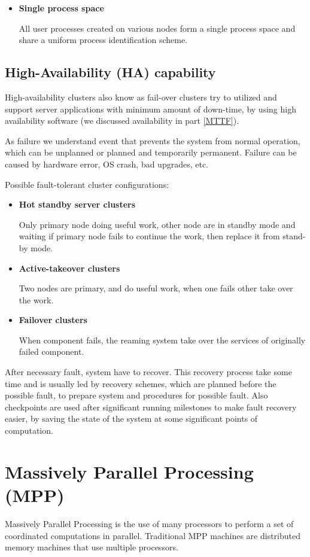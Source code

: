 \documentclass[12pt]{report}
\begin{document}
\begin{itemize}
\item \textbf{Single process space}

		All user processes created on various nodes form a single process space
and share a uniform process identification scheme.

\end{itemize}

\subsection{High-Availability (HA) capability}
High-availability clusters also know as fail-over clusters try to utilized and support server applications with minimum amount of down-time, by using high availability software (we discussed availability in part \ref{MTTF}).

As failure we understand event that prevents the system from normal operation, which can be unplanned or planned and temporarily permanent. Failure can be caused by hardware error, OS crash, bad upgrades, etc.

Possible fault-tolerant cluster configurations:
\begin{itemize}
\item \textbf{Hot standby server clusters}

		Only primary node doing useful work, other node are in standby mode and waiting if primary node fails to continue the work, then replace it from stand-by mode.
\item \textbf{Active-takeover clusters}

		Two nodes are primary, and do useful work, when one fails other take over the work.
\item \textbf{Failover clusters}

		When component fails, the reaming system take over the services of originally failed component.
\end{itemize}

After necessary fault, system have to recover. This recovery process take some time and is usually led by recovery schemes, which are planned before the possible fault, to prepare system and procedures for possible fault. Also checkpoints are used after significant running milestones to make fault recovery easier, by saving the state of the system at some significant points of computation.


\section{Massively Parallel Processing (MPP)}
Massively Parallel Processing is the use of many processors to perform a set of coordinated computations in parallel. Traditional MPP machines are distributed memory machines that use multiple processors.
\end{document}

